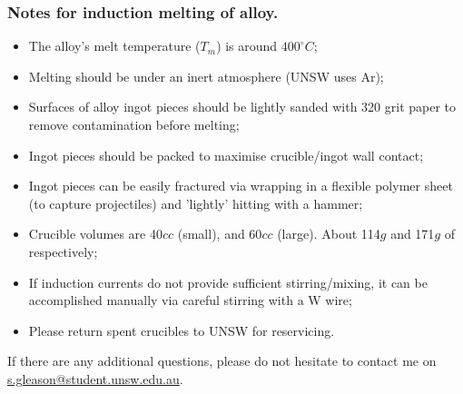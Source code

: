\subsubsection{Notes for induction melting of \MgZnCa alloy.}
\begin{itemize}
\item The \MgZnCa alloy's melt temperature ($T_{m}$) is around $400^{\circ}C$;
\item Melting should be under an inert atmosphere (UNSW uses Ar);
\item Surfaces of alloy ingot pieces should be lightly sanded with 320 grit paper to remove contamination before melting;
\item Ingot pieces should be packed to maximise crucible/ingot wall contact;
\item Ingot pieces can be easily fractured via wrapping in a flexible polymer sheet (to capture projectiles) and 'lightly' hitting with a hammer;
\item Crucible volumes are 40$cc$ (small), and 60$cc$ (large). About 114$g$ and 171$g$ of \MgZnCa respectively;
\item If induction currents do not provide sufficient stirring/mixing, it can be accomplished manually via careful stirring with a W wire; 
\item Please return spent crucibles to UNSW for reservicing. 
\end{itemize}

If there are any additional questions, please do not hesitate to contact me on \href{"mailto:s.gleason@student.unsw.edu.au"}{s.gleason@student.unsw.edu.au}. 